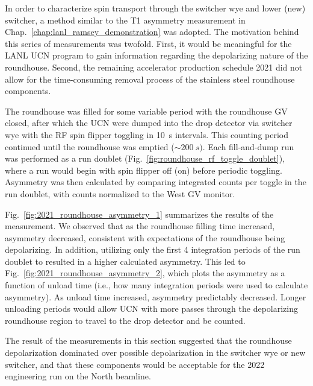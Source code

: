 In order to characterize spin transport through the switcher wye and lower (new) switcher, a method similar to the T1 asymmetry measurement in Chap.~\ref{chap:lanl_ramsey_demonstration} was adopted. The motivation behind this series of measurements was twofold. First, it would be meaningful for the LANL UCN program to gain information regarding the depolarizing nature of the roundhouse. Second, the remaining accelerator production schedule 2021 did not allow for the time-consuming removal process of the stainless steel roundhouse components.

The roundhouse was filled for some variable period with the roundhouse GV closed, after which the UCN were dumped into the drop detector via switcher wye with the RF spin flipper toggling in \qty{10}{s} intervals. This counting period continued until the roundhouse was emptied ($\sim\qty{200}{s})$. Each fill-and-dump run was performed as a run doublet (Fig.~\ref{fig:roundhouse_rf_toggle_doublet}), where a run would begin with spin flipper off (on) before periodic toggling. Asymmetry was then calculated by comparing integrated counts per toggle in the run doublet, with counts normalized to the West GV monitor. 
 
Fig.~\ref{fig:2021_roundhouse_asymmetry_1} summarizes the results of the measurement. We observed that as the roundhouse filling time increased, asymmetry decreased, consistent with expectations of the roundhouse being depolarizing. In addition, utilizing only the first 4 integration periods of the run doublet to resulted in a higher calculated asymmetry. This led to Fig.~\ref{fig:2021_roundhouse_asymmetry_2}, which plots the asymmetry as a function of unload time (i.e., how many integration periods were used to calculate asymmetry). As unload time increased, asymmetry predictably decreased. Longer unloading periods would allow UCN with more passes through the depolarizing roundhouse region to travel to the drop detector and be counted.

The result of the measurements in this section suggested that the roundhouse depolarization dominated over possible depolarization in the switcher wye or new switcher, and that these components would be acceptable for the 2022 engineering run on the North beamline.

